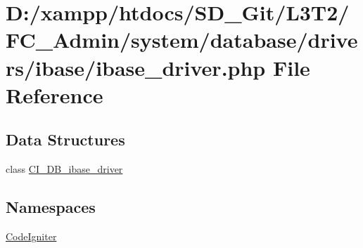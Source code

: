 \hypertarget{ibase__driver_8php}{}\section{D\+:/xampp/htdocs/\+S\+D\+\_\+\+Git/\+L3\+T2/\+F\+C\+\_\+\+Admin/system/database/drivers/ibase/ibase\+\_\+driver.php File Reference}
\label{ibase__driver_8php}
\subsection*{Data Structures}
\begin{DoxyCompactItemize}
\item 
class \hyperlink{class_c_i___d_b__ibase__driver}{C\+I\+\_\+\+D\+B\+\_\+ibase\+\_\+driver}
\end{DoxyCompactItemize}
\subsection*{Namespaces}
\begin{DoxyCompactItemize}
\item 
 \hyperlink{namespace_code_igniter}{Code\+Igniter}
\end{DoxyCompactItemize}
